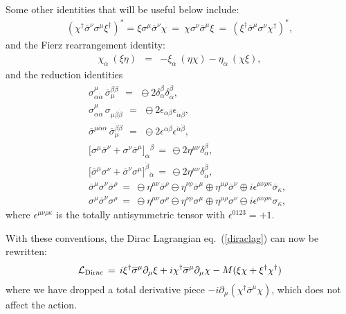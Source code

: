 \documentclass[11pt]{article}
\def\BDpos{}
\def\BDplus{+}
\def\BDminus{-}
\def\BDpos{-}
\def\BDplus{-}
\def\BDminus{+}
\def\BDpos{\oplus}
\def\BDplus{\oplus}
\def\BDminus{\ominus}
\def\BDpos{\ominus}
\def\BDplus{\ominus}
\def\BDminus{\oplus}
\def\beq{\begin{eqnarray}}
\def\eeq{\end{eqnarray}}
\def\lagr{{\cal L}}
\def\sigmabar{\overline\sigma}
\begin{document}
Some other identities that will be useful below include:
\beq
(\chi^\dagger \sigmabar^\nu \sigma^\mu \xi^\dagger)^* =
\xi\sigma^\mu \sigmabar^\nu \chi  \>=\>
\chi \sigma^\nu \sigmabar^\mu \xi \>=\>
(\xi^\dagger \sigmabar^\mu \sigma^\nu \chi^\dagger)^*,
\label{eq:dei}
\eeq
and the Fierz rearrangement identity:
\beq
\chi_{\alpha}\> (\xi\eta) &=&
- \xi_{\alpha}\> (\eta\chi) - \eta_\alpha\> (\chi\xi) ,
\label{fierce}
\eeq
and the reduction identities
\beq
&&
\sigma_{\alpha\dot{\alpha}}^\mu \,
\sigmabar_\mu^{\dot{\beta}\beta} 
\,\>=\>\, 
\BDpos 2 \delta_\alpha^\beta
\delta_{\dot{\alpha}}^{\dot{\beta}} ,
\label{eq:feif}
\\
&&
\sigma_{\alpha\dot{\alpha}}^\mu \,
\sigma_{\mu\beta\dot{\beta}} 
\,\>=\>\, 
\BDpos 2 \epsilon_{\alpha\beta}
\epsilon_{\dot{\alpha}\dot{\beta}} ,
\label{eq:rickettsisok}
\\
&&
\sigmabar^{\mu\dot\alpha\alpha} \,
\sigmabar_\mu^{\dot\beta\beta} 
\,\>=\>\, 
\BDpos 2 \epsilon^{\alpha\beta}
\epsilon^{\dot{\alpha}\dot{\beta}} ,
\label{eq:pagehousesux}
\\
&&
\bigl[ \sigma^\mu \sigmabar^\nu + \sigma^\nu \sigmabar^\mu
\bigr ]_\alpha{}^\beta  
\,=\,
\BDpos 2 \eta^{\mu\nu} \delta_\alpha^\beta 
,
\label{pauliidentA}
\\
&&
\bigl[ \sigmabar^\mu \sigma^\nu + \sigmabar^\nu \sigma^\mu \bigr
]^{\dot{\beta}}{}_{\dot{\alpha}}
\,=\,
\BDpos 2 \eta^{\mu\nu} \delta_{\dot{\alpha}}^{\dot{\beta}} ,
\label{pauliidentB}
\\
&&\sigmabar^\mu \sigma^\nu \sigmabar^\rho \>=\>
\BDpos \eta^{\mu\nu} \sigmabar^\rho 
\BDplus \eta^{\nu\rho} \sigmabar^\mu 
\BDminus \eta^{\mu\rho} \sigmabar^\nu 
\BDminus i \epsilon^{\mu\nu\rho\kappa} \sigmabar_\kappa ,
\label{eq:lloydhouserules}
\\
&&\sigma^\mu \sigmabar^\nu \sigma^\rho \>=\>
\BDpos \eta^{\mu\nu} \sigma^\rho 
\BDplus \eta^{\nu\rho} \sigma^\mu 
\BDminus \eta^{\mu\rho} \sigma^\nu 
\BDplus i \epsilon^{\mu\nu\rho\kappa} \sigma_\kappa ,
\label{eq:pagehouseisOK}
\eeq
where $\epsilon^{\mu\nu\rho\kappa}$ is the totally antisymmetric tensor
with $\epsilon^{0123}=+1$. 

With these conventions, the Dirac Lagrangian eq.~(\ref{diraclag}) can now
be rewritten: 
\beq
\lagr_{\rm Dirac}
\, = \,  i \xi^\dagger \sigmabar^\mu \partial_\mu \xi 
       + i \chi^\dagger \sigmabar^\mu \partial_\mu \chi 
       - M (\xi\chi + \xi^\dagger \chi^\dagger)
\eeq
where we have dropped a total derivative piece 
$-i\partial_\mu(\chi^\dagger \sigmabar^\mu \chi)$, 
which does not affect the action. 
\end{document}

